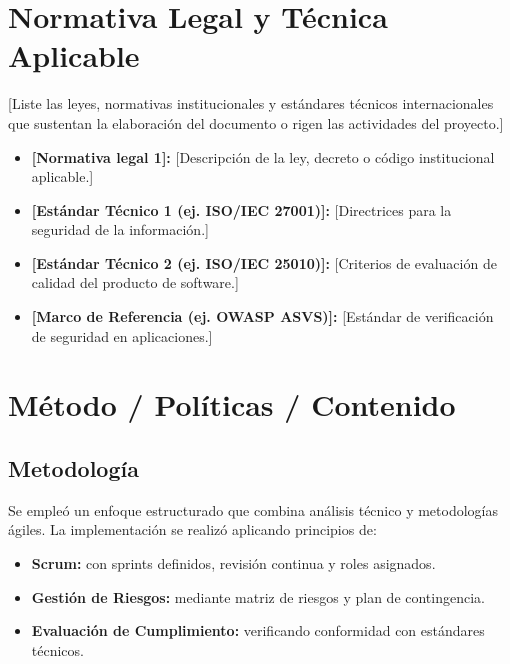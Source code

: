 \documentclass[10pt,letterpaper]{article}
\begin{document}
\section{Normativa Legal y Técnica Aplicable}

[Liste las leyes, normativas institucionales y estándares técnicos internacionales que sustentan la elaboración del documento o rigen las actividades del proyecto.]

\begin{itemize}
    \item \textbf{[Normativa legal 1]:} [Descripción de la ley, decreto o código institucional aplicable.]
    \item \textbf{[Estándar Técnico 1 (ej. ISO/IEC 27001)]:} [Directrices para la seguridad de la información.]
    \item \textbf{[Estándar Técnico 2 (ej. ISO/IEC 25010)]:} [Criterios de evaluación de calidad del producto de software.]
    \item \textbf{[Marco de Referencia (ej. OWASP ASVS)]:} [Estándar de verificación de seguridad en aplicaciones.]
\end{itemize}

\section{Método / Políticas / Contenido}

\subsection{Metodología}

Se empleó un enfoque estructurado que combina análisis técnico y metodologías ágiles. La implementación se realizó aplicando principios de:

\begin{itemize}
    \item \textbf{Scrum:} con sprints definidos, revisión continua y roles asignados.
    \item \textbf{Gestión de Riesgos:} mediante matriz de riesgos y plan de contingencia.
    \item \textbf{Evaluación de Cumplimiento:} verificando conformidad con estándares técnicos.
\end{itemize}
\end{document}
